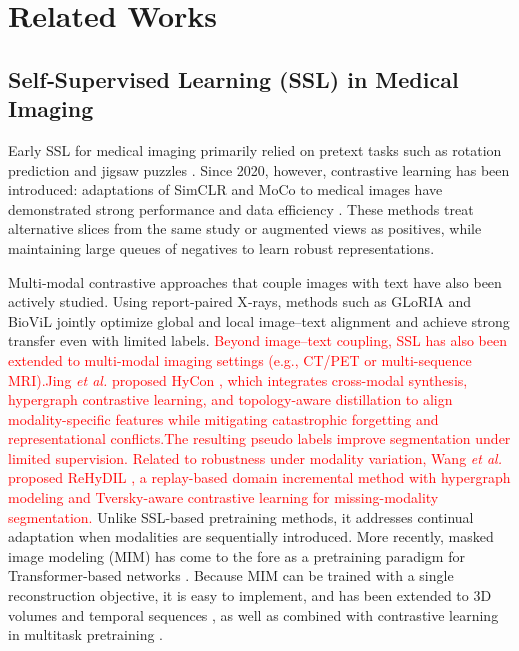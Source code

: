 \documentclass[final,1p,times]{elsarticle}
\newcommand{\revadd}[1]{\textcolor{red}{#1}}
\begin{document}
\section{Related Works}
\subsection{Self‑Supervised Learning (SSL) in Medical Imaging}
Early SSL for medical imaging primarily relied on pretext tasks such as rotation prediction and jigsaw puzzles \cite{li_rotation-oriented_2021}\cite{sugawara_breast_2025}. Since 2020, however, contrastive learning has been introduced: adaptations of SimCLR \cite{chen2020simple} and MoCo \cite{he_momentum_2020} to medical images have demonstrated strong performance and data efficiency \cite{ren_ukssl_2023}\cite{sowrirajan_moco_2021}\revadd{\cite{fan_cancer_2023}}.
These methods treat alternative slices from the same study or augmented views as positives, while maintaining large queues of negatives to learn robust representations.

Multi‑modal contrastive approaches that couple images with text have also been actively studied.
Using report‑paired X‑rays, methods such as GLoRIA \cite{huang_gloria_2021} and BioViL \cite{boecking_making_2022} jointly optimize global and local image–text alignment and achieve strong transfer even with limited labels.
\revadd{Beyond image–text coupling, SSL has also been extended to multi-modal imaging settings (e.g., CT/PET or multi-sequence MRI).Jing \emph{et al.} proposed HyCon \cite{jing_multi-modal_2025}, which integrates cross-modal synthesis, hypergraph contrastive learning, and topology-aware distillation to align modality-specific features while mitigating catastrophic forgetting and representational conflicts.The resulting pseudo labels improve segmentation under limited supervision.}
\revadd{Related to robustness under modality variation, Wang \emph{et al.} proposed ReHyDIL \cite{wang_hypergraph_2025}, a replay-based domain incremental method with hypergraph modeling and Tversky-aware contrastive learning for missing-modality segmentation. }
Unlike SSL-based pretraining methods, it addresses continual adaptation when modalities are sequentially introduced.
More recently, masked image modeling (MIM) has come to the fore as a pretraining paradigm for Transformer‑based networks \cite{zhou_self_2023}\cite{zhuang_advancing_2025}\cite{xu_swin_2023}.
Because MIM can be trained with a single reconstruction objective, it is easy to implement, and has been extended to 3D volumes \cite{yu_unest_2023} and temporal sequences \cite{buess_video-ct_2024}, as well as combined with contrastive learning in multitask pretraining \cite{tang2022self}.
\end{document}
